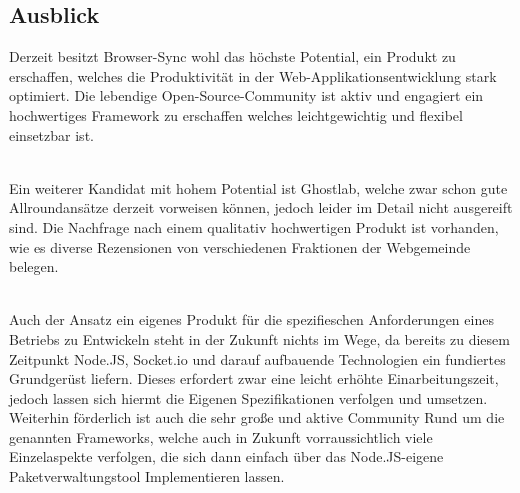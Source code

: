 \subsection{Ausblick}

Derzeit besitzt Browser-Sync wohl das höchste Potential, ein Produkt zu erschaffen, welches die Produktivität in der Web-Applikationsentwicklung stark optimiert. Die lebendige Open-Source-Community ist aktiv und engagiert ein hochwertiges Framework zu erschaffen welches leichtgewichtig und flexibel einsetzbar ist. 

\\ Ein weiterer Kandidat mit hohem Potential ist Ghostlab, welche zwar schon gute Allroundansätze derzeit vorweisen können, jedoch leider im Detail nicht ausgereift sind. Die Nachfrage nach einem qualitativ hochwertigen Produkt ist vorhanden, wie es diverse Rezensionen von verschiedenen Fraktionen der Webgemeinde belegen.

\\ Auch der Ansatz ein eigenes Produkt für die spezifieschen Anforderungen eines Betriebs zu Entwickeln steht in der Zukunft nichts im Wege, da bereits zu diesem Zeitpunkt Node.JS, Socket.io und darauf aufbauende Technologien ein fundiertes Grundgerüst liefern. 
Dieses erfordert zwar eine leicht erhöhte Einarbeitungszeit, jedoch lassen sich hiermt die Eigenen Spezifikationen verfolgen und umsetzen. Weiterhin förderlich ist auch die sehr große und aktive Community Rund um die genannten Frameworks, welche auch in Zukunft vorraussichtlich viele Einzelaspekte verfolgen, die sich dann einfach über das Node.JS-eigene Paketverwaltungstool Implementieren lassen.